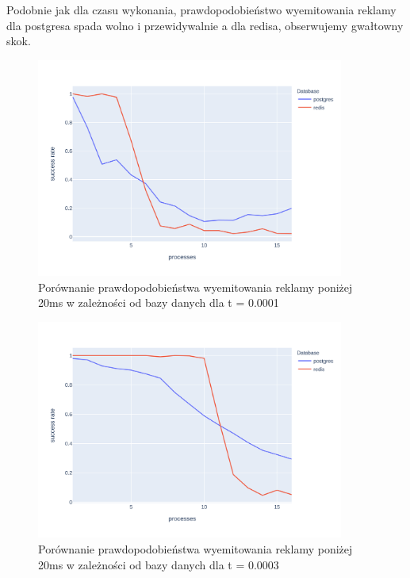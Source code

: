\documentclass[10pt]{article}
\begin{document}
Podobnie jak dla czasu wykonania, prawdopodobieństwo wyemitowania reklamy dla postgresa spada wolno i przewidywalnie a dla redisa, obserwujemy gwałtowny skok.

\begin{figure}[H]
    \centering
    \includegraphics[width=0.9\textwidth]{./graphs/success_rate_postgres_vs_redis_0001.png}
    \caption{Porównanie prawdopodobieństwa wyemitowania reklamy poniżej 20ms w zależności od bazy danych dla t = 0.0001}
\end{figure}

\begin{figure}[H]
    \centering
    \includegraphics[width=0.9\textwidth]{./graphs/success_rate_postgres_vs_redis_0003.png}
    \caption{Porównanie prawdopodobieństwa wyemitowania reklamy poniżej 20ms w zależności od bazy danych dla t = 0.0003}
\end{figure}
\end{document}
